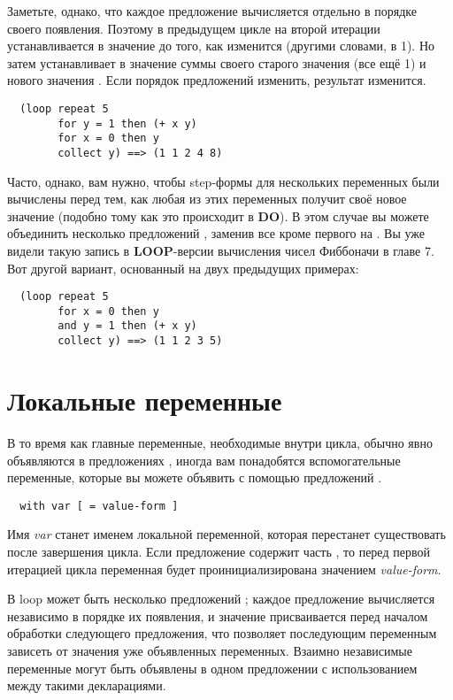 Заметьте, однако, что каждое предложение  вычисляется отдельно в порядке своего
появления. Поэтому в предыдущем цикле на второй итерации  устанавливается в
значение  до того, как  изменится (другими словами, в 1). Но 
затем устанавливает в значение суммы своего старого значения (все ещё 1) и нового значения
. Если порядок предложений  изменить, результат изменится.

\begin{lstlisting}
  (loop repeat 5
        for y = 1 then (+ x y)
        for x = 0 then y
        collect y) ==> (1 1 2 4 8)
\end{lstlisting}

Часто, однако, вам нужно, чтобы step-формы для нескольких переменных были вычислены перед
тем, как любая из этих переменных получит своё новое значение (подобно тому как это
происходит в \textbf{DO}). В этом случае вы можете объединить несколько предложений
, заменив все кроме первого  на . Вы уже видели такую запись
в \textbf{LOOP}-версии вычисления чисел Фиббоначи в главе 7. Вот другой вариант,
основанный на двух предыдущих примерах:

\begin{lstlisting}
  (loop repeat 5 
        for x = 0 then y
        and y = 1 then (+ x y)
        collect y) ==> (1 1 2 3 5)
\end{lstlisting}

\section{Локальные переменные}

В то время как главные переменные, необходимые внутри цикла, обычно явно объявляются в
предложениях , иногда вам понадобятся вспомогательные переменные, которые вы
можете объявить с помощью предложений .

\begin{lstlisting}
  with var [ = value-form ]
\end{lstlisting}

Имя \textit{var} станет именем локальной переменной, которая перестанет существовать после
завершения цикла. Если предложение  содержит часть , то
перед первой итерацией цикла переменная будет проинициализирована значением
\textit{value-form}.

В loop может быть несколько предложений ; каждое предложение вычисляется
независимо в порядке их появления, и значение присваивается перед началом обработки
следующего предложения, что позволяет последующим переменным зависеть от значения уже
объявленных переменных. Взаимно независимые переменные могут быть объявлены в одном
предложении  с использованием  между такими декларациями.

